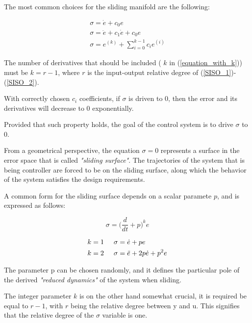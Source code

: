 \documentclass{thesisreport}
\begin{document}
The most common choices for the sliding manifold are the following:

\begin{align}
\sigma = \dot{e} + c_0 e\\
\sigma = \ddot{e} + c_1 \dot{e} + c_0 e \\
\sigma = e^{(k)} + \sum_{i=0}^{k-1} c_i e^{(i)}\label{equation_with_k}
\end{align} 



The number of derivatives that should be included ( $k$ in (\ref{equation_with_k})) must be $k=r-1$, where $r$ is the input-output relative
degree of  (\ref{SISO_1})-(\ref{SISO_2}).


With correctly chosen $c_i$ coefficients, if $\sigma$ is driven to 0, then the error and its derivatives will decrease to 0 exponentially.



Provided that such property holds, the goal of the  control system is to drive $\sigma$ to 0.


From a geometrical perspective, the equation $\sigma=0$ represents a surface in the error space that is called \textit{"sliding surface"}. The trajectories of the system that is being controller are forced to be on the sliding surface, along which the behavior of the system satisfies the design requirements.


A common form for the sliding surface depends on a  scalar paramete $p$, and is expressed as follows:

\begin{equation}
\sigma = \bigg(\frac{d}{dt}+p\bigg)^k e
\end{equation}

\begin{align}
k&=1 \text{\hspace{0.5cm}} \sigma = \dot{e} + pe \\
k&=2 \text{\hspace{0.5cm}} \sigma = \ddot{e} + 2p \dot{e} + p^2 e
\end{align}
 
\noindent The parameter p can be chosen randomly, and it defines the particular pole of the derived \textit{"reduced dynamics"} of the system when sliding.
 

\noindent The integer parameter $k$ is on the other hand somewhat crucial, it is required be equal to $r-1$, with $r$ being the relative
degree between y and u. This signifies that the relative degree of the $\sigma$ variable is one.
\end{document}
